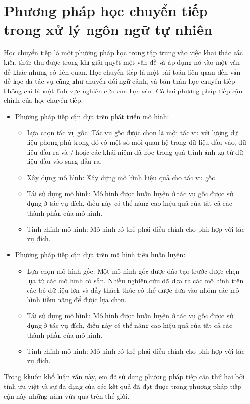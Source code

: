 \documentclass[14pt]{extreport}
\begin{document}
\chapter{Phương pháp học chuyển tiếp trong xử lý ngôn ngữ tự nhiên}
Học chuyển tiếp là một phương pháp học  trong tập trung vào việc khai thác các kiến thức thu được trong khi giải quyết một vấn đề và áp dụng nó vào một vấn đề khác nhưng có liên quan. Học chuyển tiếp là một bài toán liên quan đến vấn đề học đa tác vụ cũng như chuyển đổi ngữ cảnh, và bản thân học chuyển tiếp không chỉ là một lĩnh vực nghiên cứu của học sâu. Có hai phương pháp tiếp cận chính của học chuyển tiếp:
\begin{itemize}
    \item Phương pháp tiếp cận dựa trên phát triển mô hình:
    \begin{itemize}
        \item Lựa chọn tác vụ gốc: Tác vụ gốc được chọn là một tác vụ với lượng dữ liệu phong phú trong đó có một số mối quan hệ trong dữ liệu đầu vào, dữ liệu đầu ra và / hoặc các khái niệm đã học trong quá trình ánh xạ từ dữ liệu đầu vào sang đầu ra.
        \item Xây dựng mô hình: Xây dựng mô hình hiệu quả cho tác vụ gốc.
        \item Tái sử dụng mô hình: Mô hình được huấn luyện ở tác vụ gốc được sử dụng ở tác vụ đích, điều này có thể nâng cao hiệu quả của tất cả các thành phần của mô hình.
        \item Tinh chỉnh mô hình: Mô hình có thể phải điều chỉnh cho phù hợp với tác vụ đích.
    \end{itemize}
    \item Phương pháp tiếp cận dựa trên mô hình tiền huấn luyện:
    \begin{itemize}
        \item Lựa chọn mô hình gốc: Một mô hình gốc được đào tạo trước được chọn lựa từ các mô hình có sẵn. Nhiều nghiên cứu đã đưa ra các mô hình trên các bộ dữ liệu lớn và đầy thách thức có thể được đưa vào nhóm các mô hình tiềm năng để được lựa chọn.
        \item Tái sử dụng mô hình: Mô hình được huấn luyện ở tác vụ gốc được sử dụng ở tác vụ đích, điều này có thể nâng cao hiệu quả của tất cả các thành phần của mô hình.
        \item Tinh chỉnh mô hình: Mô hình có thể phải điều chỉnh cho phù hợp với tác vụ đích.
    \end{itemize}
\end{itemize}
Trong khuôn khổ luận văn này, em đã sử dụng phương pháp tiếp cận thứ hai bởi tính ưu việt và sự đa dạng của các kết quả đã đạt được trong phương pháp tiếp cận này những năm vừa qua trên thế giới.
\end{document}

